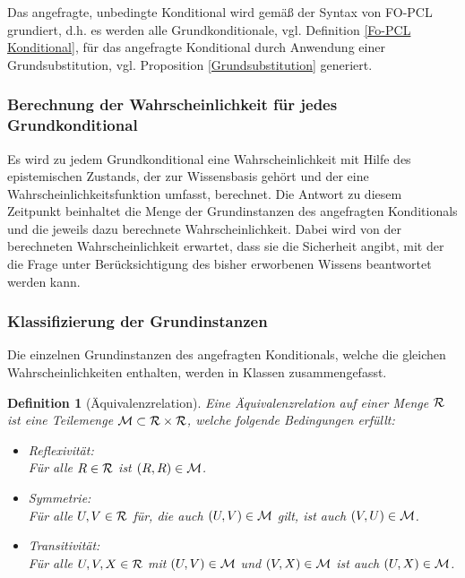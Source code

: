 \documentclass[a4paper, 11pt]{book}
\newtheorem{Def}{Definition }[section]
\begin{document}
Das angefragte, unbedingte Konditional wird gemäß der Syntax von FO-PCL grundiert, d.h. es werden alle Grundkonditionale, vgl. Definition \ref{Fo-PCL Konditional}, für das angefragte Konditional durch Anwendung einer Grundsubstitution, vgl. Proposition \ref{Grundsubstitution} generiert.

\subsubsection{Berechnung der Wahrscheinlichkeit für jedes Grundkonditional}
Es wird zu jedem Grundkonditional eine Wahrscheinlichkeit mit Hilfe des epistemischen Zustands, der zur Wissensbasis gehört und der eine Wahrscheinlichkeitsfunktion umfasst, berechnet. Die Antwort zu diesem Zeitpunkt beinhaltet die Menge der Grundinstanzen des angefragten Konditionals und die jeweils dazu berechnete Wahrscheinlichkeit. Dabei wird von der berechneten Wahrscheinlichkeit erwartet, dass sie die Sicherheit angibt, mit der die Frage unter Berücksichtigung des bisher erworbenen Wissens beantwortet werden kann.
	
\subsubsection{Klassifizierung der Grundinstanzen} 
Die einzelnen Grundinstanzen des angefragten Konditionals, welche die gleichen Wahrscheinlichkeiten enthalten, werden in Klassen zusammengefasst.

\begin{Def}[Äquivalenzrelation] \label{Äquivalenzrelation}
Eine Äquivalenzrelation auf einer Menge $ \cal{R} $  ist eine Teilemenge $ \cal{M} \subset \cal{R} \times \cal{R}$, welche folgende Bedingungen erfüllt:
\begin{itemize}
	\item Reflexivität:\\
	 Für alle $ R \in \cal{R} $ ist $ (R,R) \in \cal{M} $.
	\item Symmetrie: \\
	Für alle $ U,V \in \cal{R} $ für, die auch  $ (U,V) \in \cal{M} $ gilt, ist auch  $ (V,U) \in \cal{M} $.
	\item  Transitivität:\\
	Für alle $ U,V,X  \in \cal{R} $ mit $ (U,V) \in \cal{M} $ und $ (V,X) \in \cal{M} $ ist auch $ (U,X) \in \cal{M} $.
\end{itemize}
\end{Def}
\end{document}
